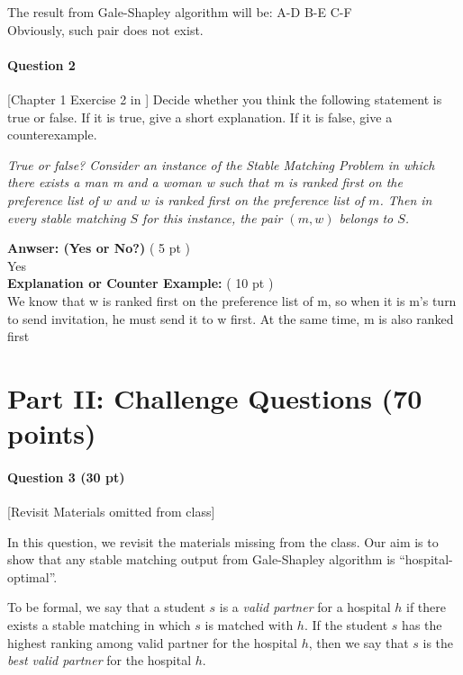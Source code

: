         The result from Gale-Shapley algorithm will be: A-D B-E C-F \\
        Obviously, such pair does not exist. \\
        

    \bigskip

    \paragraph*{Question 2}[Chapter 1 Exercise 2 in \cite{KT05}] Decide whether you think the following statement is true or false. If it is  true, give a short explanation. If it is false, give a counterexample.
    
    \medskip
    
    \emph{True or false? Consider an instance of the Stable Matching Problem in which there exists a man m and a woman w such that m is ranked first on the preference list of $w$ and $w$ is ranked first on the preference list of $m$. Then in  every stable matching $S$ for this instance, the pair $(m, w)$ belongs to $S$.}

    \medskip

    \noindent
    {\bf Anwser: (Yes or No?)} ( 5 pt )\\
        Yes \\
    {\bf Explanation or Counter Example:} ( 10 pt )\\
    We know that w is ranked first on the preference list of m, so when it is m's turn to send invitation, he must send it to w first. At the same time, m is also ranked first
    \bigskip

\pagebreak

\section*{Part II: Challenge Questions (70 points)}

\paragraph*{Question 3 (30 pt)} [Revisit Materials omitted from class]

In this question, we revisit the materials missing from the class. Our aim is to show that any stable matching output from Gale-Shapley algorithm is ``hospital-optimal''.

To be formal, we say that a student $s$ is a {\em valid partner} for a hospital $h$ if there exists a stable matching in which $s$ is matched with $h$. If the student $s$ has the highest ranking among valid partner for the hospital $h$, then we say that $s$ is the {\em best valid partner} for the hospital $h$.

